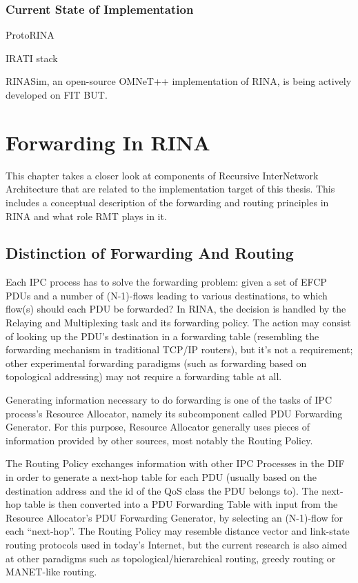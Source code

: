         \subsection{Current State of Implementation}

            ProtoRINA

            IRATI stack

            RINASim, an open-source OMNeT++ implementation of RINA, is being actively developed on FIT BUT.


\chapter{Forwarding In RINA}\label{forwarding}

    This chapter takes a closer look at components of Recursive InterNetwork Architecture that are related to the implementation target of this thesis. This includes a conceptual description of the forwarding and routing principles in RINA and what role RMT plays in it.

    \section{Distinction of Forwarding And Routing}

        Each IPC process has to solve the forwarding problem: given a set of EFCP PDUs and a number of (N-1)-flows leading to various destinations, to which flow(s) should each PDU be forwarded? In RINA, the decision is handled by the Relaying and Multiplexing task and its forwarding policy. The action may consist of looking up the PDU's destination in a forwarding table (resembling the forwarding mechanism in traditional TCP/IP routers), but it's not a requirement; other experimental forwarding paradigms (such as forwarding based on topological addressing) may not require a forwarding table at all.

        Generating information necessary to do forwarding is one of the tasks of IPC process's Resource Allocator, namely its subcomponent called PDU Forwarding Generator. For this purpose, Resource Allocator generally uses pieces of information provided by other sources, most notably the Routing Policy.

        The Routing Policy exchanges information with other IPC Processes in the DIF in order to generate a next-hop table for each PDU (usually based on the destination address and the id of the QoS class the PDU belongs to). The next-hop table is then converted into a PDU Forwarding Table with input from the Resource Allocator's PDU Forwarding Generator, by selecting an (N-1)-flow for each ``next-hop''. The Routing Policy may resemble distance vector and link-state routing protocols used in today's Internet, but the current research is also aimed at other paradigms such as topological/hierarchical routing, greedy routing or MANET-like routing.


